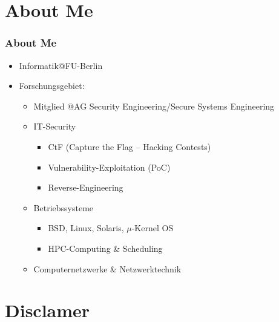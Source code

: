 \documentclass[xcolor=dvipsnames,aspectratio=169]{beamer}
\begin{document}
\section*{About Me}
\begin{frame}
\frametitle{About Me}
\begin{itemize}
	\item Informatik@FU-Berlin
	\item Forschungsgebiet:
	\begin{itemize}
		\item Mitglied @AG Security Engineering/Secure Systems Engineering
		\item IT-Security
		\begin{itemize}
			\item CtF (Capture the Flag -- Hacking Contests)
			\item Vulnerability-Exploitation (PoC)
			\item Reverse-Engineering
		\end{itemize}
		\item Betriebssysteme
		\begin{itemize}
			\item BSD, Linux, Solaris, $\mu$-Kernel OS
			\item HPC-Computing \& Scheduling
		\end{itemize}
		\item Computernetzwerke \& Netzwerktechnik
	\end{itemize}
\end{itemize} 
\end{frame}

\section{Disclamer}
\end{document}
